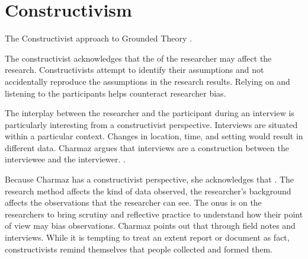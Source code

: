 

\section{Constructivism}
\label{Constructivism}
The Constructivist approach to Grounded Theory  \cite{StolGroundedTheory}. 

The constructivist acknowledges that the  of the researcher may affect the research. Constructivists attempt to identify their assumptions and not accidentally reproduce the assumptions in the research results. Relying on and listening to the participants helps counteract researcher bias.

The interplay between the researcher and the participant during an interview is particularly interesting from a constructivist perspective. Interviews are situated within a particular context. Changes in location, time, and setting would result in different data.  Charmaz argues that interviews are a construction between the interviewee and the interviewer.  \cite{Charmaz}.

Because Charmaz has a constructivist perspective, she acknowledges that  \cite{Charmaz}. The research method affects the kind of data observed, the researcher's background affects the observations that the researcher can see. The onus is on the researchers to bring scrutiny and reflective practice to understand how their point of view may bias observations. Charmaz points out that  through field notes and interviews. While it is tempting to treat an extent report or document as fact, constructivists remind themselves that people collected and formed them.

